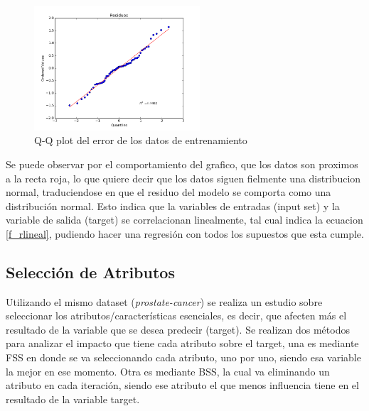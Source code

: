 \documentclass[10pt]{article}
\begin{document}
\begin{itemize}
\begin{figure}[h]
    \centering
    \includegraphics[width=0.55\textwidth]{images/qqplot}
    \caption{Q-Q plot del error de los datos de entrenamiento}
    \label{fig:mesh1}
\end{figure}

Se puede observar por el comportamiento del grafico, que los datos son proximos a la recta roja, lo que quiere decir que los datos siguen fielmente una distribucion normal, traduciendose en que el residuo del modelo se comporta como una distribución normal. Esto indica que la variables de entradas (input set) y la variable de salida (target) se correlacionan linealmente, tal cual indica la ecuacion \eqref{f_rlineal}, pudiendo hacer una regresión con todos los supuestos que esta cumple.

\end{itemize}
 
 \newpage
\subsection{Selección de Atributos}
Utilizando el mismo dataset (\textit{prostate-cancer}) se realiza un estudio sobre seleccionar los atributos/características esenciales, es decir, que afecten más el resultado de la variable que se desea predecir (target). Se realizan dos métodos para analizar el impacto que tiene cada atributo sobre el target, una es mediante FSS en donde se va seleccionando cada atributo, uno por uno, siendo esa variable la mejor en ese momento. Otra es mediante BSS, la cual va eliminando un atributo en cada iteración, siendo ese atributo el que menos influencia tiene en el resultado de la variable target.
\end{document}
